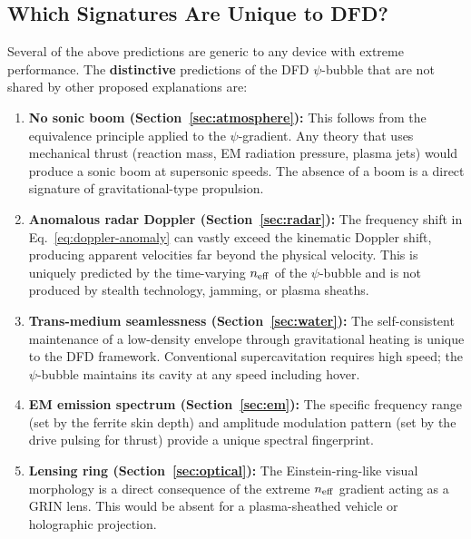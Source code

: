 \documentclass[11pt]{article}
\newcommand{\neff}{n_{\rm eff}}
\begin{document}
\subsection{Which Signatures Are Unique to DFD?}

Several of the above predictions are generic to any device with extreme
performance. The \textbf{distinctive} predictions of the DFD $\psi$-bubble
that are not shared by other proposed explanations are:

\begin{enumerate}
\item \textbf{No sonic boom (Section~\ref{sec:atmosphere}):} This follows
  from the equivalence principle applied to the $\psi$-gradient. Any
  theory that uses mechanical thrust (reaction mass, EM radiation pressure,
  plasma jets) would produce a sonic boom at supersonic speeds. The absence
  of a boom is a direct signature of gravitational-type propulsion.

\item \textbf{Anomalous radar Doppler (Section~\ref{sec:radar}):} The
  frequency shift in Eq.~\eqref{eq:doppler-anomaly} can vastly exceed
  the kinematic Doppler shift, producing apparent velocities far beyond
  the physical velocity. This is uniquely predicted by the time-varying
  $\neff$ of the $\psi$-bubble and is not produced by stealth technology,
  jamming, or plasma sheaths.

\item \textbf{Trans-medium seamlessness (Section~\ref{sec:water}):} The
  self-consistent maintenance of a low-density envelope through
  gravitational heating is unique to the DFD framework. Conventional
  supercavitation requires high speed; the $\psi$-bubble maintains its
  cavity at any speed including hover.

\item \textbf{EM emission spectrum (Section~\ref{sec:em}):} The specific
  frequency range (set by the ferrite skin depth) and amplitude modulation
  pattern (set by the drive pulsing for thrust) provide a unique
  spectral fingerprint.

\item \textbf{Lensing ring (Section~\ref{sec:optical}):} The
  Einstein-ring-like visual morphology is a direct consequence of the
  extreme $\neff$ gradient acting as a GRIN lens. This would be absent for
  a plasma-sheathed vehicle or holographic projection.
\end{enumerate}


\end{document}
